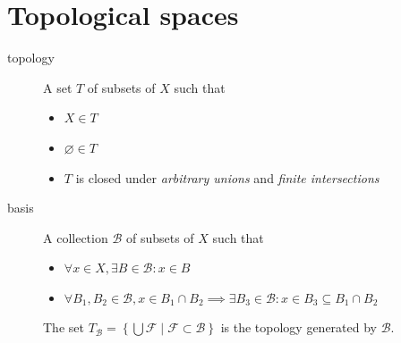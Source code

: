 \documentclass[tbtags,columns=2]{cheatsheet}
\begin{document}
\section{Topological spaces}
\begin{description}
    \item[topology] A set $T$ of subsets of $X$ such that \begin{itemize}
        \item $X \in T$
        \item $\varnothing \in T$
        \item $T$ is closed under \emph{arbitrary unions} and \emph{finite intersections}
    \end{itemize}
    \item[basis] A collection $\mathcal{B}$ of subsets of $X$ such that \begin{itemize}
        \item $\forall x \in X,\exists B\in \mathcal{B}: x\in B$
        \item $\forall B_{1},B_{2} \in \mathcal{B},x \in B_{1}\cap B_{2}\implies \exists B_{3}\in\mathcal{B}:x \in B_3\subseteq B_{1}\cap B_{2}$
    \end{itemize}
    The set $T_\mathcal{B}=\left\{ \bigcup \mathcal{F} \mid \mathcal{F} \subset \mathcal{B} \right\}$ is the topology generated by $\mathcal{B}$.


\end{description}
\end{document}
